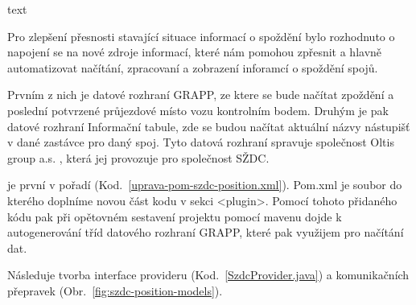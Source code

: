 text


Pro zlepšení přesnosti stavající situace informací o spoždění bylo rozhodnuto o napojení se na nové zdroje informací, které nám pomohou zpřesnit a hlavně automatizovat načítání, zpracovaní a zobrazení inforamcí o spoždění spojů.

Prvním z nich je datové rozhraní GRAPP, ze ktere se bude načítat zpoždění a poslední potvrzené průjezdové místo vozu kontrolním bodem. Druhým je pak datové rozhraní Informační tabule, zde se budou načítat aktuální názvy nástupišť v dané zastávce pro daný spoj. Tyto datová rozhraní spravuje společnost Oltis group a.s. , která jej provozuje pro společnost SŽDC.

je první v pořadí (Kod.~\ref{uprava-pom-szdc-position.xml}). Pom.xml je soubor do kterého doplníme novou část kodu v sekci <plugin>. Pomocí tohoto přidaného kódu pak při opětovném sestavení projektu pomocí mavenu dojde k autogenerování tříd datového rozhraní GRAPP, které pak využijem pro načítání dat.


Následuje tvorba interface provideru (Kod.~\ref{SzdcProvider.java}) a komunikačních přepravek (Obr.~\ref{fig:szdc-position-models}).
 	
